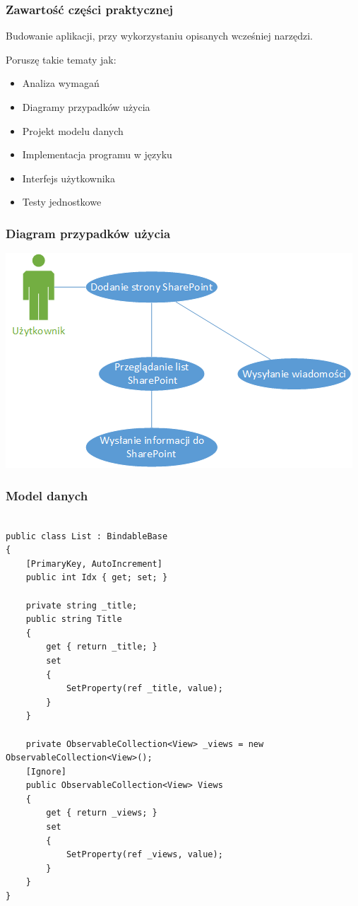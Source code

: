 \begin{frame}
\frametitle{Zawartość części praktycznej}
Budowanie aplikacji, przy wykorzystaniu opisanych wcześniej narzędzi.

Poruszę takie tematy jak:
\begin{itemize}
\item Analiza wymagań
\item Diagramy przypadków użycia
\item Projekt modelu danych
\item Implementacja programu w języku \Csharp
\item Interfejs użytkownika
\item Testy jednostkowe
\end{itemize}
\end{frame}



\begin{frame}[fragile]
\frametitle{Diagram przypadków użycia}
\includegraphics[scale=0.5]{example_usecase}
\end{frame}

\begin{frame}[fragile]
\frametitle{Model danych}
 \begin{adjustbox}{width=\textwidth}
\begin{lstlisting}[language=CSharp,basicstyle=\ttfamily]

public class List : BindableBase
{     
    [PrimaryKey, AutoIncrement]
    public int Idx { get; set; }    
	
    private string _title;
    public string Title
    {
        get { return _title; }
        set
        {
            SetProperty(ref _title, value);
        }
    }     
	
    private ObservableCollection<View> _views = new ObservableCollection<View>();
    [Ignore]
    public ObservableCollection<View> Views
    {
        get { return _views; }
        set
        {
            SetProperty(ref _views, value);                
        }
    }
}

\end{lstlisting}
\end{adjustbox}
\end{frame}

